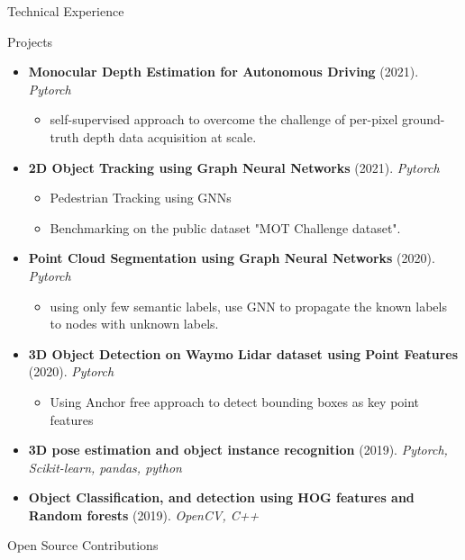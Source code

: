 \documentclass[]{mcdowellcv}
\begin{document}
	\begin{cvsection}{Technical Experience}
		\begin{cvsubsection}{Projects}{}{}
			\begin{itemize}
				\item \textbf{Monocular Depth Estimation for Autonomous Driving} (2021). \textit{Pytorch}
					\begin{itemize}
						\item self-supervised approach to overcome the challenge of per-pixel ground-truth depth data acquisition at scale.
					\end{itemize}
				\item \textbf{2D Object Tracking using Graph Neural Networks} (2021). \textit{Pytorch}
					\begin{itemize}
						\item Pedestrian Tracking using GNNs
						\item Benchmarking on the public dataset "MOT Challenge dataset".
					\end{itemize}
				\item \textbf{Point Cloud Segmentation using Graph Neural Networks} (2020). \textit{Pytorch}
					\begin{itemize}
						\item using only few semantic labels, use GNN to propagate the known labels to nodes with unknown labels.
					\end{itemize}
				\item \textbf{3D Object Detection on Waymo Lidar dataset using Point Features} (2020). \textit{Pytorch}
					\begin{itemize}
						\item Using Anchor free approach to detect bounding boxes as key point features
					\end{itemize}
				\item \textbf{3D pose estimation and object instance recognition} (2019). \textit{Pytorch, Scikit-learn, pandas, python}
				\item \textbf{Object Classification, and detection using HOG features and Random forests} (2019). \textit{OpenCV, C++}
			\end{itemize}
		\end{cvsubsection}
		\begin{cvsubsection}{Open Source Contributions}{}{}		
		\begin{itemize}

\end{itemize}
\end{cvsubsection}
\end{cvsection}
\end{document}
